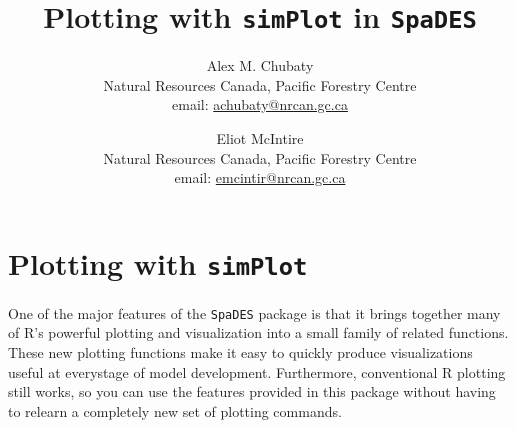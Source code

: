 \documentclass{article}
\title{Plotting with \texttt{simPlot} in \texttt{SpaDES}}
\author{
  Alex M. Chubaty\\
  \small{Natural Resources Canada, Pacific Forestry Centre}\\
	\small{email: \href{mailto:achubaty@nrcan.gc.ca}{achubaty@nrcan.gc.ca}}
	\and
	Eliot McIntire\\
	\small{Natural Resources Canada, Pacific Forestry Centre}\\
	\small{email: \href{mailto:emcintir@nrcan.gc.ca}{emcintir@nrcan.gc.ca}}
}
\begin{document}


\maketitle

\tableofcontents

\newpage

\section{Plotting with \texttt{simPlot}}

\paragraph{}
One of the major features of the \texttt{SpaDES} package is that it brings together many of \textsf{R}'s powerful plotting and visualization into a small family of related functions. These new plotting functions make it easy to quickly produce visualizations useful at everystage of model development. Furthermore, conventional R plotting still works, so you can use the features provided in this package without having to relearn a completely new set of plotting commands.
\end{document}
